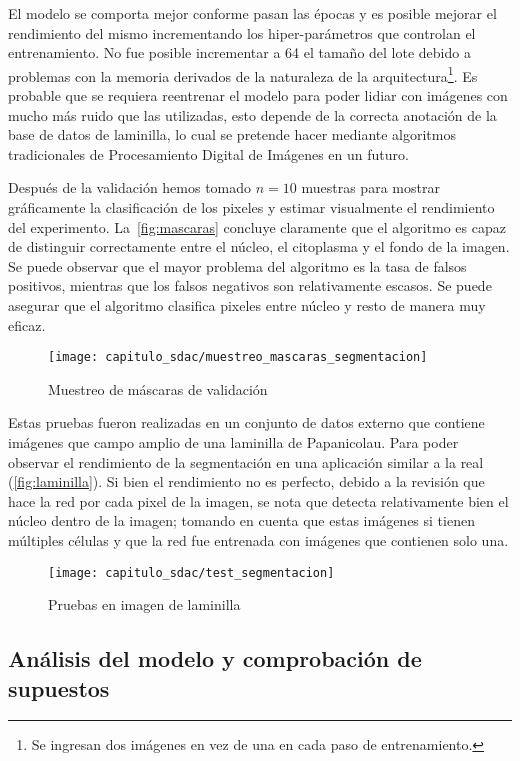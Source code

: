 El modelo se comporta mejor conforme pasan las épocas y es posible mejorar el
rendimiento del mismo incrementando los hiper-parámetros que controlan el
entrenamiento. No fue posible incrementar a 64 el tamaño del lote debido a
problemas con la memoria derivados de la naturaleza de la
arquitectura\footnote{Se ingresan dos imágenes en vez de una en cada paso de
entrenamiento.}. Es probable que se requiera reentrenar el modelo para poder
lidiar con imágenes con mucho más ruido que las utilizadas, esto depende de la
correcta anotación de la base de datos de laminilla, lo cual se pretende hacer
mediante algoritmos tradicionales de Procesamiento Digital de Imágenes en un
futuro.

Después de la validación hemos tomado \(n = 10\) muestras para mostrar
gráficamente la clasificación de los pixeles y estimar visualmente el
rendimiento del experimento. La~\autoref{fig:mascaras} concluye claramente que
el algoritmo es capaz de distinguir correctamente entre el núcleo, el citoplasma
y el fondo de la imagen. Se puede observar que el mayor problema del algoritmo
es la tasa de falsos positivos, mientras que los falsos negativos son
relativamente escasos. Se puede asegurar que el algoritmo clasifica pixeles
entre núcleo y resto de manera muy eficaz.

\begin{figure}[H]
    \centering
    \texttt{[image: capitulo\_sdac/muestreo\_mascaras\_segmentacion]}
    \caption{Muestreo de máscaras de validación}\label{fig:mascaras}
\end{figure}

Estas pruebas fueron realizadas en un conjunto de datos externo que contiene
imágenes que campo amplio de una laminilla de Papanicolau. Para poder observar
el rendimiento de la segmentación en una aplicación similar a la real
(\autoref{fig:laminilla}). Si bien el rendimiento no es perfecto, debido a la
revisión que hace la red por cada pixel de la imagen, se nota que detecta
relativamente bien el núcleo dentro de la imagen; tomando en cuenta que estas
imágenes si tienen múltiples células y que la red fue entrenada con imágenes que
contienen solo una.

\begin{figure}[H]
    \centering
    \texttt{[image: capitulo\_sdac/test\_segmentacion]}
    \caption{Pruebas en imagen de laminilla}\label{fig:laminilla}
\end{figure}

\subsection{Análisis del modelo y comprobación de supuestos}

